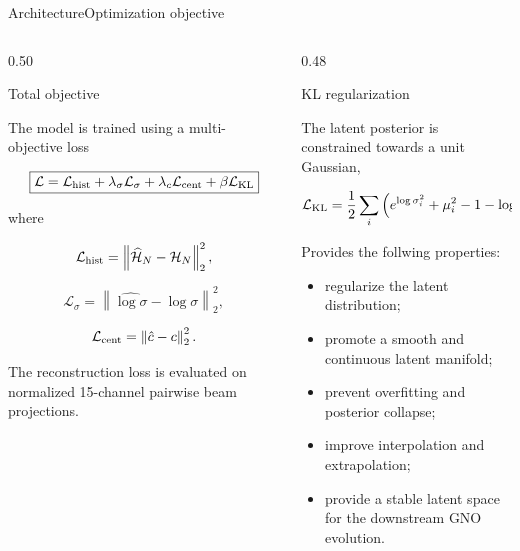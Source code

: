 \documentclass[aspectratio=169,t,11pt,table]{beamer}
{\setbeamercovered{transparent}}
\begin{document}
\begin{frame}{Architecture}{Optimization objective}

\vspace{-0.7cm}

\begin{columns}[T]

\begin{column}{0.50\textwidth}

\begin{purpleBlock}{\centering\small{Total objective}}

\tiny

The model is trained using a multi-objective loss

\[
\boxed{
\mathcal L =
\mathcal L_{\rm hist}
+
\lambda_\sigma \mathcal L_\sigma
+
\lambda_c \mathcal L_{\rm cent}
+
\beta \mathcal L_{\rm KL}
}
\]

where

\[
\mathcal L_{\rm hist}
=
\left\|
\widehat{\mathcal H}_N-
\mathcal H_N
\right\|_2^2,
\]

\[
\mathcal L_\sigma
=
\left\|
\widehat{\log\sigma}
-
\log\sigma
\right\|_2^2,
\]

\[
\mathcal L_{\rm cent}
=
\left\|
\hat c-c
\right\|_2^2.
\]

The reconstruction loss is evaluated on normalized
15-channel pairwise beam projections.

\end{purpleBlock}

\end{column}

\begin{column}{0.48\textwidth}

\begin{purpleBlock}{\centering\small{KL regularization}}

\tiny

The latent posterior is constrained towards a unit Gaussian,

\[
\mathcal L_{\rm KL}
=
\frac12
\sum_i
\left(
e^{\log\sigma_i^2}
+
\mu_i^2
-
1
-
\log\sigma_i^2
\right).
\]

Provides the follwing properties: 
\begin{itemize}
\item regularize the latent distribution;
\item promote a smooth and continuous latent manifold;
\item prevent overfitting and posterior collapse;
\item improve interpolation and extrapolation;
\item provide a stable latent space for the downstream GNO evolution.
\end{itemize}

\end{purpleBlock}

\end{column}

\end{columns}

\end{frame}
\end{document}
